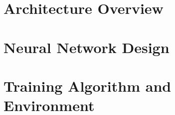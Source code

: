 \section{Architecture Overview}

\section{Neural Network Design}

\section{Training Algorithm and Environment}
\label{subsec:tita_training_environment}
